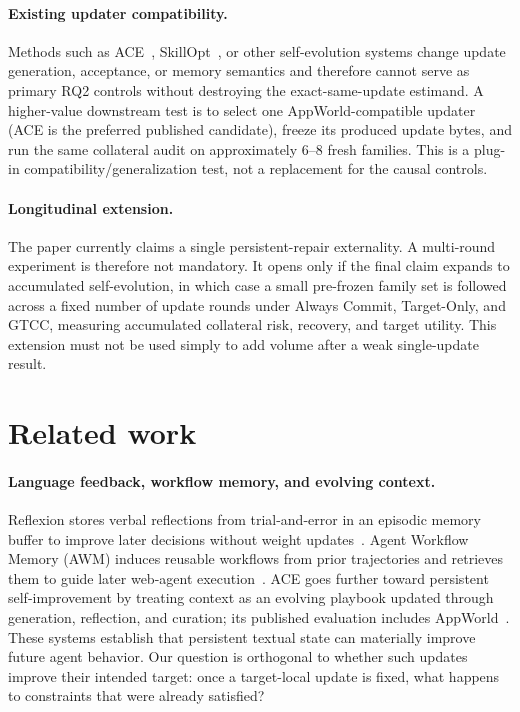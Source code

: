 \documentclass{article}
\begin{document}
\paragraph{Existing updater compatibility.}
Methods such as ACE~\citep{zhang2026ace}, SkillOpt~\citep{yang2026skillopt}, or other self-evolution systems change update generation, acceptance, or memory semantics and therefore cannot serve as primary RQ2 controls without destroying the exact-same-update estimand. A higher-value downstream test is to select one AppWorld-compatible updater (ACE is the preferred published candidate), freeze its produced update bytes, and run the same collateral audit on approximately 6--8 fresh families. This is a plug-in compatibility/generalization test, not a replacement for the causal controls.

\paragraph{Longitudinal extension.}
The paper currently claims a single persistent-repair externality. A multi-round experiment is therefore not mandatory. It opens only if the final claim expands to accumulated self-evolution, in which case a small pre-frozen family set is followed across a fixed number of update rounds under Always Commit, Target-Only, and GTCC, measuring accumulated collateral risk, recovery, and target utility. This extension must not be used simply to add volume after a weak single-update result.

\section{Related work}
\label{sec:related}
\paragraph{Language feedback, workflow memory, and evolving context.}
Reflexion stores verbal reflections from trial-and-error in an episodic memory buffer to improve later decisions without weight updates~\citep{shinn2023reflexion}. Agent Workflow Memory (AWM) induces reusable workflows from prior trajectories and retrieves them to guide later web-agent execution~\citep{wang2025awm}. ACE goes further toward persistent self-improvement by treating context as an evolving playbook updated through generation, reflection, and curation; its published evaluation includes AppWorld~\citep{zhang2026ace}. These systems establish that persistent textual state can materially improve future agent behavior. Our question is orthogonal to whether such updates improve their intended target: once a target-local update is fixed, what happens to constraints that were already satisfied?
\end{document}
